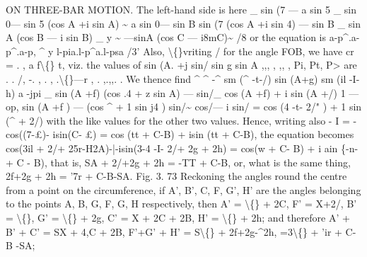 \documentclass[12pt,a4paper]{article}
\begin{document}
ON THREE-BAR MOTION.
The left-hand side
is here
\_ sin (7 --- a sin 5 \_ sin 0--- sin 5 (cos A +i sin A)
\textasciitilde{} a sin 0--- sin B
sin (7 (cos A +i sin 4) --- sin B
\_
sin A (cos B --- i sin B) \_
y
\textasciitilde{} ---sinA (cos C --- i8mC)\textasciitilde{}
/8
or the equation
is
a-p\textasciicircum{}.a-p\textasciicircum{}.a-p,
\textasciicircum{}
y
l-pia.l-p\textasciicircum{}a.l-psa
/3'
Also,
\textbackslash\{\}vriting /
for
the
angle FOB,
we
have
cr =
.
,
a
f\textbackslash\{\} t,
viz.
the
values
of
sin (A. +j
sin/
sin g
sin A
,,,
,
,,
,
Pi,
Pt, P> are
.
. /,
-.
,
.
, .\textbackslash\{\}---r
,
.
,.,,.
. We thence
find
\textasciicircum{}
\textasciicircum{}
-\textasciicircum{}
sm (\textasciicircum{} -t-/)
sin (A+g)
sm (il
-I- h)
a -jpi \_ sin (A +f) (cos .4 + z sin A) --- sin/\_ cos (A +f) + i sin (A +/)
1 --- op,
sin (A +f ) --- (cos \textasciicircum{} + 1 sin j4 ) sin/\textasciitilde{}
cos/--- i sin/
= cos (4
-t- 2/" ) + 1 sin (\textasciicircum{} + 2/)
with
the
like
values
for
the
other
two
values.
Hence, writing
also
- I = - cos((7-\pounds{})- isin(C- \pounds{}) = cos (tt + C-B) + isin (tt + C-B),
the equation becomes
cos(3il + 2/+ 25r-H2A)-|-isin(3-4
-I- 2/+ 2g + 2h) = cos(w + C- B) + i ain \{-n- + C - B),
that
is,
SA + 2/+2g + 2h =
-TT + C-B,
or, what
is the same thing,
2f+2g + 2h = '7r + C-B-SA.
Fig.
3.
73
Reckoning
the
angles
round
the
centre
from
a
point
on
the
circumference,
if
A',
B',
C, F,
G',
H'
are
the
angles
belonging
to
the
points
A,
B,
G,
F,
G, H
respectively, then
A' = \textbackslash\{\} + 2C,
F' = X+2/,
B' = \textbackslash\{\},
G' = \textbackslash\{\} + 2g,
C' = X + 2C + 2B,
H' = \textbackslash\{\} + 2h;
and
therefore
A' + B' + C' = SX + 4,C + 2B,
F'+G' + H' = S\textbackslash\{\} + 2f+2g-\textasciicircum{}2h,
=3\textbackslash\{\} + 'ir + C-B -SA;
\end{document}
